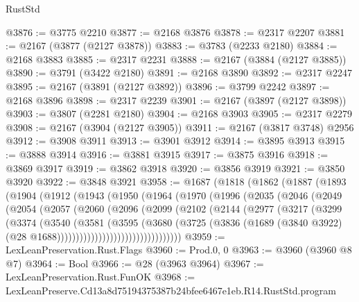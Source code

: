 \begin{lexlean}{RustStd}
\begin{coremodule}
@3876 := @3775 @2210
@3877 := @2168 @3876
@3878 := @2317 @2207
@3881 := @2167 (@3877 (@2127 @3878))
@3883 := @3783 (@2233 @2180)
@3884 := @2168 @3883
@3885 := @2317 @2231
@3888 := @2167 (@3884 (@2127 @3885))
@3890 := @3791 (@3422 @2180)
@3891 := @2168 @3890
@3892 := @2317 @2247
@3895 := @2167 (@3891 (@2127 @3892))
@3896 := @3799 @2242
@3897 := @2168 @3896
@3898 := @2317 @2239
@3901 := @2167 (@3897 (@2127 @3898))
@3903 := @3807 (@2281 @2180)
@3904 := @2168 @3903
@3905 := @2317 @2279
@3908 := @2167 (@3904 (@2127 @3905))
@3911 := @2167 (@3817 @3748) @2956
@3912 := @3908 @3911
@3913 := @3901 @3912
@3914 := @3895 @3913
@3915 := @3888 @3914
@3916 := @3881 @3915
@3917 := @3875 @3916
@3918 := @3869 @3917
@3919 := @3862 @3918
@3920 := @3856 @3919
@3921 := @3850 @3920
@3922 := @3848 @3921
@3958 := @1687
    (@1818
      (@1862
        (@1887
          (@1893
            (@1904
              (@1912
                (@1943
                  (@1950
                    (@1964
                      (@1970
                        (@1996
                          (@2035
                            (@2046
                              (@2049
                                (@2054
                                  (@2057
                                    (@2060
                                      (@2096
                                        (@2099
                                          (@2102
                                            (@2144
                                              (@2977
                                                (@3217
                                                  (@3299
                                                    (@3374
                                                      (@3540
                                                        (@3581
                                                          (@3595
                                                            (@3680
                                                              (@3725
                                                                (@3836
                                                                  (@1689
                                                                    (@3840 @3922)
                                                                    (@28
                                                                      @1688)))))))))))))))))))))))))))))))))
@3959 := LexLeanPreservation.Rust.Flags
@3960 := Prod.{0, 0}
@3963 := @3960 (@3960 @8 @7)
@3964 := Bool
@3966 := @28 (@3963 @3964)
@3967 := LexLeanPreservation.Rust.FunOK
@3968 := LexLeanPreserve.Cd13a8d75194375387b24bfee6467e1eb.R14.RustStd.program

\end{coremodule}
\end{lexlean}
